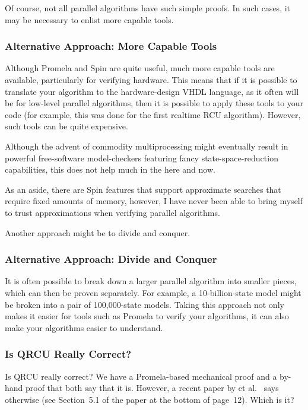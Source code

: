 Of course, not all parallel algorithms have such simple proofs.
In such cases, it may be necessary to enlist more capable tools.

\subsubsection{Alternative Approach: More Capable Tools}
\label{sec:formal:Alternative Approach: More Capable Tools}

Although Promela and Spin are quite useful,
much more capable tools are available, particularly for verifying
hardware.
This means that if it is possible to translate your algorithm
to the hardware-design VHDL language, as it often will be for
low-level parallel algorithms, then it is possible to apply these
tools to your code (for example, this was done for the first
realtime RCU algorithm).
However, such tools can be quite expensive.

Although the advent of commodity multiprocessing
might eventually result in powerful free-software model-checkers
featuring fancy state-space-reduction capabilities,
this does not help much in the here and now.

As an aside, there are Spin features that support approximate searches
that require fixed amounts of memory, however, I have never been able
to bring myself to trust approximations when verifying parallel
algorithms.

Another approach might be to divide and conquer.

\subsubsection{Alternative Approach: Divide and Conquer}
\label{sec:formal:Alternative Approach: Divide and Conquer}

It is often possible to break down a larger parallel algorithm into
smaller pieces, which can then be proven separately.
For example, a 10-billion-state model might be broken into a pair
of 100,000-state models.
Taking this approach not only makes it easier for tools such as
Promela to verify your algorithms, it can also make your algorithms
easier to understand.

\subsubsection{Is QRCU Really Correct?}
\label{sec:formal:Is QRCU Really Correct?}

Is QRCU really correct?
We have a Promela-based mechanical proof and a by-hand proof that both
say that it is.
However, a recent paper by  et al.~\cite{JadeAlglave2013-cav}
says otherwise (see Section~5.1 of the paper at the bottom of page~12).
Which is it?


